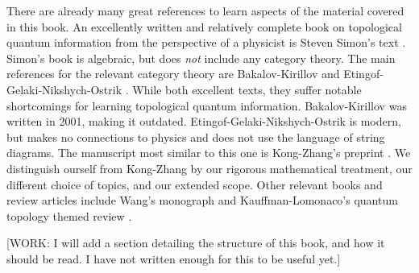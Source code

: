 There are already many great references to learn aspects of the material covered in this book. An excellently written and relatively complete book on topological quantum information from the perspective of a physicist is Steven Simon's text \cite{simon2023topological}. Simon's book is algebraic, but does \textit{not} include any category theory. The main references for the relevant category theory are Bakalov-Kirillov \cite{bakalov2001lectures} and Etingof-Gelaki-Nikshych-Ostrik \cite{etingof2016tensor}. While both excellent texts, they suffer notable shortcomings for learning topological quantum information. Bakalov-Kirillov was written in 2001, making it outdated. Etingof-Gelaki-Nikshych-Ostrik is modern, but makes no connections to physics and does not use the language of string diagrams. The manuscript most similar to this one is Kong-Zhang's preprint \cite{kong2022invitation}. We distinguish ourself from Kong-Zhang by our rigorous mathematical treatment, our different choice of topics, and our extended scope. Other relevant books and review articles include Wang's monograph \cite{wang2010topological} and Kauffman-Lomonaco's quantum topology themed review \cite{kauffman2009topological}.

[WORK: I will add a section detailing the structure of this book, and how it should be read. I have not written enough for this to be useful yet.]